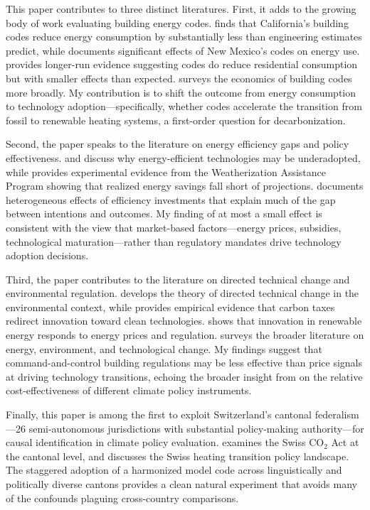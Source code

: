 \documentclass[12pt]{article}
\begin{document}
This paper contributes to three distinct literatures. First, it adds to the growing body of work evaluating building energy codes. \citet{levinson2016energy} finds that California's building codes reduce energy consumption by substantially less than engineering estimates predict, while \citet{jacobsen2016untapped} documents significant effects of New Mexico's codes on energy use. \citet{kotchen2017longer} provides longer-run evidence suggesting codes do reduce residential consumption but with smaller effects than expected. \citet{davis2014economics} surveys the economics of building codes more broadly. My contribution is to shift the outcome from energy consumption to technology adoption---specifically, whether codes accelerate the transition from fossil to renewable heating systems, a first-order question for decarbonization.

Second, the paper speaks to the literature on energy efficiency gaps and policy effectiveness. \citet{allcott2014short} and \citet{gerarden2017assessing} discuss why energy-efficient technologies may be underadopted, while \citet{fowlie2018energy} provides experimental evidence from the Weatherization Assistance Program showing that realized energy savings fall short of projections. \citet{myers2022heterogeneous} documents heterogeneous effects of efficiency investments that explain much of the gap between intentions and outcomes. My finding of at most a small effect is consistent with the view that market-based factors---energy prices, subsidies, technological maturation---rather than regulatory mandates drive technology adoption decisions.

Third, the paper contributes to the literature on directed technical change and environmental regulation. \citet{acemoglu2012environment} develops the theory of directed technical change in the environmental context, while \citet{aghion2016carbon} provides empirical evidence that carbon taxes redirect innovation toward clean technologies. \citet{noailly2016directing} shows that innovation in renewable energy responds to energy prices and regulation. \citet{popp2010energy} surveys the broader literature on energy, environment, and technological change. My findings suggest that command-and-control building regulations may be less effective than price signals at driving technology transitions, echoing the broader insight from \citet{gillingham2018cost} on the relative cost-effectiveness of different climate policy instruments.

Finally, this paper is among the first to exploit Switzerland's cantonal federalism---26 semi-autonomous jurisdictions with substantial policy-making authority---for causal identification in climate policy evaluation. \citet{brunner2012does} examines the Swiss CO$_2$ Act at the cantonal level, and \citet{deboer2021} discusses the Swiss heating transition policy landscape. The staggered adoption of a harmonized model code across linguistically and politically diverse cantons provides a clean natural experiment that avoids many of the confounds plaguing cross-country comparisons.
\end{document}
